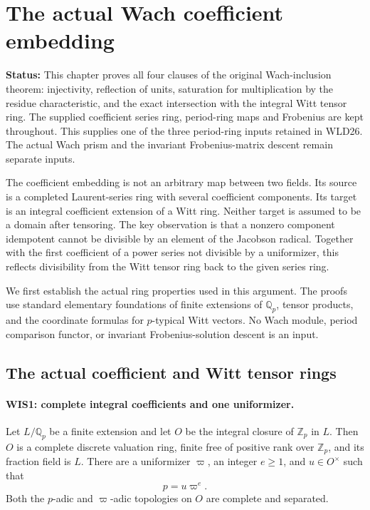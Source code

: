 \documentclass[11pt,a4paper]{article}
\numberwithin{equation}{section}
\theoremstyle{remark}\newtheorem{remark}[theorem]{Remark}
\newcommand{\status}[1]{\textbf{Status:} #1}
\begin{document}
\section{The actual Wach coefficient embedding}
\label{sec:wach-inclusion-saturation-v054}

\status{This chapter proves all four clauses of the original
Wach-inclusion theorem: injectivity, reflection of units, saturation
for multiplication by the residue characteristic, and the exact
intersection with the integral Witt tensor ring. The supplied
coefficient series ring, period-ring maps and Frobenius are kept
throughout. This supplies one of the three period-ring inputs
retained in WLD26. The actual Wach prism and the invariant
Frobenius-matrix descent remain separate inputs.}

The coefficient embedding is not an arbitrary map between two fields.
Its source is a completed Laurent-series ring with several coefficient
components. Its target is an integral coefficient extension of a Witt
ring. Neither target is assumed to be a domain after tensoring.
The key observation is that a nonzero component idempotent cannot be
divisible by an element of the Jacobson radical. Together with the
first coefficient of a power series not divisible by a uniformizer,
this reflects divisibility from the Witt tensor ring back to the
given series ring.

We first establish the actual ring properties used in this argument.
The proofs use standard elementary foundations of finite extensions
of $\mathbb Q_p$, tensor products, and the coordinate formulas for
$p$-typical Witt vectors. No Wach module, period comparison functor,
or invariant Frobenius-solution descent is an input.

\subsection{The actual coefficient and Witt tensor rings}

\paragraph{WIS1: complete integral coefficients and one uniformizer.}
\label{claim:WIS1}
Let $L/\mathbb Q_p$ be a finite extension and let $O$ be the integral
closure of $\mathbb Z_p$ in $L$. Then $O$ is a complete discrete
valuation ring, finite free of positive rank over $\mathbb Z_p$,
and its fraction field is $L$. There are a uniformizer $\varpi$,
an integer $e\geq1$, and $u\in O^\times$ such that
\[
                         p=u\varpi^e.                     \tag{WIS.1}
\]
Both the $p$-adic and $\varpi$-adic topologies on $O$ are complete
and separated.
\end{document}
